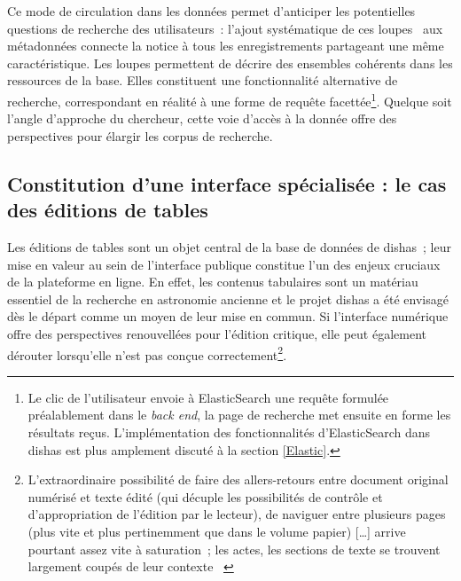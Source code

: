 \documentclass[a4paper,12pt,twoside]{book}
\newcommand{\eng}{\emph}
\newcommand{\p}{[\ldots]\xspace}
\newcommand{\bdd}{base de données\xspace}
\newcommand{\g}[1]{\og#1~\fg}
\newcommand{\dishas}{\gls{dishas}\xspace}
\begin{document}
Ce mode de circulation dans les données permet d'anticiper les potentielles questions de recherche des utilisateurs~: l'ajout systématique de ces \g{loupes} aux métadonnées connecte la notice à tous les enregistrements partageant une même caractéristique. Les loupes permettent de décrire des ensembles cohérents dans les ressources de la base. Elles constituent une fonctionnalité alternative de recherche, correspondant en réalité à une forme de requête facettée\footnote{Le clic de l'utilisateur envoie à ElasticSearch une requête formulée préalablement dans le \eng{back end}, la page de recherche met ensuite en forme les résultats reçus. L'implémentation des fonctionnalités d'ElasticSearch dans \dishas est plus amplement discuté à la section \ref{Elastic}.}. Quelque soit l'angle d'approche du chercheur, cette voie d'accès à la donnée offre des perspectives pour élargir les corpus de recherche.

		\subsection{Constitution d'une interface spécialisée : le cas des éditions de tables}
Les éditions de tables sont un objet central de la \bdd de \dishas~; leur mise en valeur au sein de l'interface publique constitue l'un des enjeux cruciaux de la plateforme en ligne. En effet, les contenus tabulaires sont un matériau essentiel de la recherche en astronomie ancienne et le projet \dishas a été envisagé dès le départ comme un moyen de leur mise en commun. Si l'interface numérique offre des perspectives renouvellées pour l'édition critique, elle peut également dérouter lorsqu'elle n'est pas conçue correctement\footnote{\g{L'extraordinaire possibilité de faire des allers-retours entre document original numérisé et texte édité (qui décuple les possibilités de contrôle et d'appropriation de l'édition par le lecteur), de naviguer entre plusieurs pages (plus vite et plus pertinemment que dans le volume papier) \p arrive pourtant assez vite à saturation~; les actes, les sections de texte se trouvent largement coupés de leur contexte} \cite{bertrandHistorienMedievistePratique2007}}.
\end{document}
